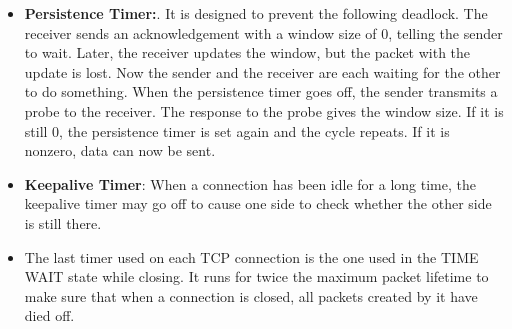 \documentclass[twoside]{article}
\begin{document}
\begin{itemize}
   \item \textbf{Persistence Timer:}. It is designed to prevent the following deadlock. The receiver sends an acknowledgement with a window size of 0, telling the sender to wait. Later, the receiver updates the window, but the packet with the update is lost. Now the sender and the receiver are each waiting for the other to do something. When the persistence timer goes off, the sender transmits a probe to the receiver. The response to the probe gives the window size. If it is still 0, the persistence timer is set again and the cycle repeats. If it is nonzero, data can now be sent.
   \item \textbf{Keepalive Timer}: When a connection has been idle for a long time, the keepalive timer may go off to cause one side to check whether the other side is still there.
   \item The last timer used on each TCP connection is the one used in the TIME WAIT state while closing. It runs for twice the maximum packet lifetime to make sure that when a connection is closed, all packets created by it have died off.
\end{itemize}
\end{document}
